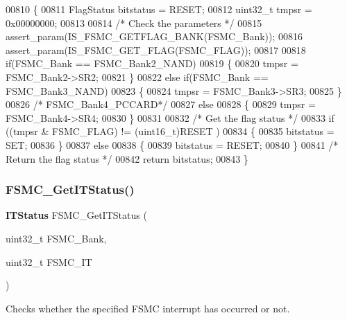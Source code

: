 \begin{DoxyCode}
00810 \{
00811   FlagStatus bitstatus = RESET;
00812   uint32\_t tmpsr = 0x00000000;
00813   
00814   \textcolor{comment}{/* Check the parameters */}
00815   assert_param(IS_FSMC_GETFLAG_BANK(FSMC\_Bank));
00816   assert_param(IS_FSMC_GET_FLAG(FSMC\_FLAG));
00817   
00818   \textcolor{keywordflow}{if}(FSMC\_Bank == FSMC_Bank2_NAND)
00819   \{
00820     tmpsr = FSMC_Bank2->SR2;
00821   \}  
00822   \textcolor{keywordflow}{else} \textcolor{keywordflow}{if}(FSMC\_Bank == FSMC_Bank3_NAND)
00823   \{
00824     tmpsr = FSMC_Bank3->SR3;
00825   \}
00826   \textcolor{comment}{/* FSMC\_Bank4\_PCCARD*/}
00827   \textcolor{keywordflow}{else}
00828   \{
00829     tmpsr = FSMC_Bank4->SR4;
00830   \} 
00831   
00832   \textcolor{comment}{/* Get the flag status */}
00833   \textcolor{keywordflow}{if} ((tmpsr & FSMC\_FLAG) != (uint16\_t)RESET )
00834   \{
00835     bitstatus = SET;
00836   \}
00837   \textcolor{keywordflow}{else}
00838   \{
00839     bitstatus = RESET;
00840   \}
00841   \textcolor{comment}{/* Return the flag status */}
00842   \textcolor{keywordflow}{return} bitstatus;
00843 \}
\end{DoxyCode}
\mbox{\label{group__FSMC__Group4_ga7fce9ca889d33cd8b8b7413875dd4d73}} 
\subsubsection{F\+S\+M\+C\+\_\+\+Get\+I\+T\+Status()}
{\footnotesize\ttfamily \textbf{ I\+T\+Status} F\+S\+M\+C\+\_\+\+Get\+I\+T\+Status (\begin{DoxyParamCaption}\item[{uint32\+\_\+t}]{F\+S\+M\+C\+\_\+\+Bank,  }\item[{uint32\+\_\+t}]{F\+S\+M\+C\+\_\+\+IT }\end{DoxyParamCaption})}



Checks whether the specified F\+S\+MC interrupt has occurred or not. 


